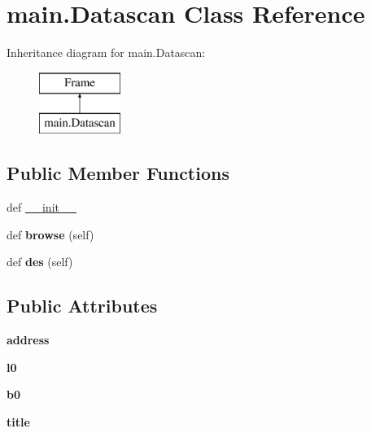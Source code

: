 \hypertarget{classmain_1_1_datascan}{}\section{main.\+Datascan Class Reference}
\label{classmain_1_1_datascan}
Inheritance diagram for main.\+Datascan\+:\begin{figure}[H]
\begin{center}
\leavevmode
\includegraphics[height=2.000000cm]{classmain_1_1_datascan}
\end{center}
\end{figure}
\subsection*{Public Member Functions}
\begin{DoxyCompactItemize}
\item 
def \hyperlink{classmain_1_1_datascan_a75285f8f90631fe7661f29bb3e272fee}{\+\_\+\+\_\+init\+\_\+\+\_\+}
\item 
\hypertarget{classmain_1_1_datascan_a63b24a9e46917a900d419b7e4e9f1691}{}def {\bfseries browse} (self)\label{classmain_1_1_datascan_a63b24a9e46917a900d419b7e4e9f1691}

\item 
\hypertarget{classmain_1_1_datascan_a14ac37e12f6e1ec7ab378c3cbe2f15cb}{}def {\bfseries des} (self)\label{classmain_1_1_datascan_a14ac37e12f6e1ec7ab378c3cbe2f15cb}

\end{DoxyCompactItemize}
\subsection*{Public Attributes}
\begin{DoxyCompactItemize}
\item 
\hypertarget{classmain_1_1_datascan_a24941fbd92175dc228d9f396619e5a13}{}{\bfseries address}\label{classmain_1_1_datascan_a24941fbd92175dc228d9f396619e5a13}

\item 
\hypertarget{classmain_1_1_datascan_a79a379a932a86ad29673415ba630a764}{}{\bfseries l0}\label{classmain_1_1_datascan_a79a379a932a86ad29673415ba630a764}

\item 
\hypertarget{classmain_1_1_datascan_a448e8c3a009857e5a57de18429a1764d}{}{\bfseries b0}\label{classmain_1_1_datascan_a448e8c3a009857e5a57de18429a1764d}

\item 
\hypertarget{classmain_1_1_datascan_acc9117ed521eacea2240f642980f2950}{}{\bfseries title}\label{classmain_1_1_datascan_acc9117ed521eacea2240f642980f2950}

\end{DoxyCompactItemize}



